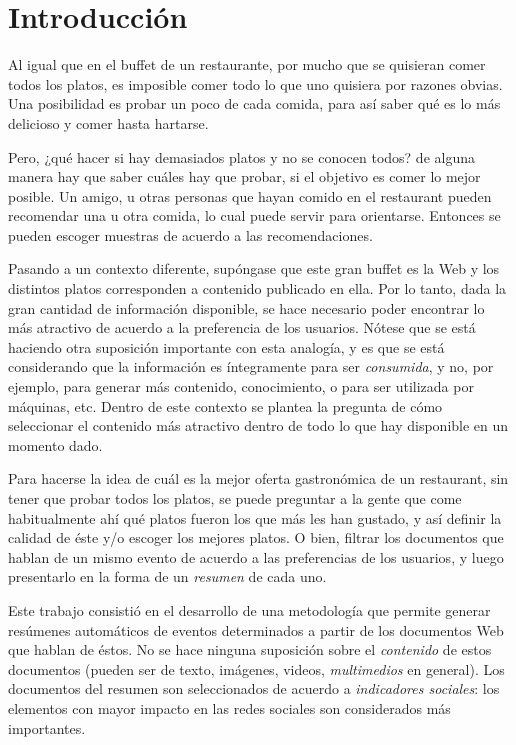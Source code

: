 \chapter{Introducción}
\label{sec-1}


  Al igual que en el buffet de un restaurante, por mucho que se quisieran
  comer todos los platos, es imposible comer todo lo que uno
  quisiera por razones obvias. Una posibilidad es probar un poco de cada
  comida, para así saber qué es lo más delicioso y comer hasta
  hartarse.

  Pero, ¿qué hacer si hay demasiados platos y no se conocen todos? de
  alguna manera hay que saber cuáles hay que probar, si el objetivo es
  comer lo mejor posible. Un amigo, u otras personas que hayan comido
  en el restaurant pueden recomendar una u otra comida,
  lo cual puede servir para orientarse. Entonces se pueden escoger
  muestras de acuerdo a las recomendaciones.


  Pasando a un contexto diferente, supóngase que este gran buffet es la
  Web y los distintos platos corresponden a contenido publicado en
  ella. Por lo tanto, dada la gran cantidad de información disponible,
  se hace necesario poder encontrar lo más atractivo de acuerdo a la
  preferencia de los usuarios. Nótese que se está
  haciendo otra suposición importante con esta analogía, y es que se
  está considerando que la información es íntegramente para ser
  \emph{consumida}, y no, por ejemplo, para generar más contenido,
  conocimiento, o para ser utilizada por máquinas, etc. Dentro de
  este contexto se plantea la pregunta de cómo seleccionar el contenido
  más atractivo dentro de todo lo que hay disponible en un momento dado.

  Para hacerse la idea de cuál es la mejor oferta gastronómica de un
  restaurant, sin tener que probar todos los platos, se puede
  preguntar a la gente que come habitualmente ahí qué platos fueron
  los que más les han gustado, y así definir la calidad de éste y/o
  escoger los mejores platos. O bien, filtrar los documentos que
  hablan de un mismo evento de acuerdo a las preferencias de los
  usuarios, y luego presentarlo en la forma de un \emph{resumen} de cada
  uno.

  Este trabajo consistió en el desarrollo de una metodología
  que permite generar resúmenes automáticos de eventos determinados
  a partir de los documentos Web que hablan de éstos. No se hace
  ninguna suposición sobre el \emph{contenido} de estos documentos (pueden
  ser de texto, imágenes, videos, \emph{multimedios} en general). Los
  documentos del resumen son seleccionados de acuerdo a
  \emph{indicadores sociales}: los elementos con mayor impacto en las redes
  sociales son considerados más importantes.

